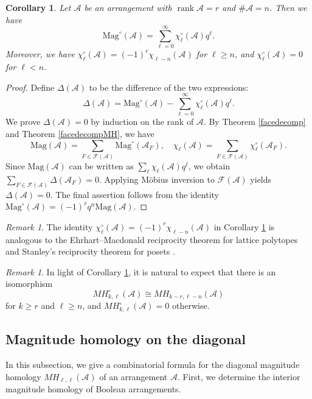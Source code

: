 \documentclass{amsart}
\numberwithin{equation}{section}
\newtheorem{cor}[thm]{Corollary}
\theoremstyle{plain}
\theoremstyle{remark}
\newtheorem{rem}[thm]{Remark}
\theoremstyle{definition}
\numberwithin{equation}{section}
\newcommand{\A}{\mathcal{A}}
\newcommand{\FF}{\mathcal{F}}
\newcommand{\Mag}{\mathrm{Mag}}
\DeclareMathOperator{\rank}{rank}
\begin{document}
\begin{cor}\label{reformulation}
Let $\A$ be an arrangement with $\rank \A=r$ and $\#\A=n$.
Then we have
\[
\Mag^\circ(\A)=\sum_{\ell=0}^{\infty}\chi_{\ell}^{\circ}(\A)q^{\ell}.
\]
Moreover, we have $\chi_{\ell}^{\circ}(\A)=(-1)^r\chi_{\ell-n}(\A)$ for $\ell\geq n$, and $\chi_{\ell}^{\circ}(\A)=0$ for $\ell<n$.
\end{cor}

\begin{proof}
    Define $\Delta(\A)$ to be the difference of the two expressions:
    \[
    \Delta(\A)=\Mag^\circ(\A)-\sum_{\ell=0}^\infty\chi_\ell^\circ(\A)q^\ell.
    \]
    We prove $\Delta(\A)=0$ by induction on the rank of $\A$.
    By Theorem \ref{facedecomp} and Theorem \ref{facedecompMH}, we have
    \[
    \Mag(\A)=\sum_{F\in \FF(\A)}\Mag^\circ(\A_F), \quad \chi_\ell(\A)=\sum_{F\in \FF(\A)}\chi^\circ_{\ell}(\A_F).
    \]
    Since $\Mag(\A)$ can be written as $\sum_\ell \chi_\ell(\A)q^\ell$, we obtain
    $\sum_{F\in \FF(\A)}\Delta(\A_F)=0$.
    Applying M\"obius inversion to $\FF(\A)$ yields $\Delta(\A)=0$.
    The final assertion follows from the identity $\Mag^\circ(\A)=(-1)^rq^n\Mag(\A)$.
\end{proof}

\begin{rem}
    The identity $\chi_{\ell}^{\circ}(\A)=(-1)^r\chi_{\ell-n}(\A)$ in Corollary \ref{reformulation} is analogous to the Ehrhart--Macdonald reciprocity theorem for lattice polytopes \cite{Ehrhart1967Reciprocity,Macdonald1971} and Stanley's reciprocity theorem for posets \cite{Stanley1970}.
\end{rem}

\begin{rem}\label{magcpxintmagcpx}
    In light of Corollary \ref{reformulation}, it is natural to expect that there is an isomorphism
    \[
    MH^\circ_{k,\ell}(\A)\cong MH_{k-r,\ell-n}(\A)
    \]
    for $k\geq r$ and $\ell\geq n$, and $MH^\circ_{k,\ell}(\A)=0$ otherwise.
\end{rem}

\subsection{Magnitude homology on the diagonal}

In this subsection, we give a combinatorial formula for the diagonal magnitude homology $MH_{\ell,\ell}(\A)$ of an arrangement $\A$.
First, we determine the interior magnitude homology of Boolean arrangements.
\end{document}

